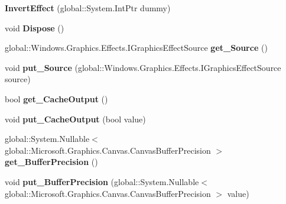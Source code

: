\begin{DoxyCompactItemize}
{\bfseries Invert\+Effect} (global\+::\+System.\+Int\+Ptr dummy)
\item 
\mbox{\label{class_microsoft_1_1_graphics_1_1_canvas_1_1_effects_1_1_invert_effect_a4cbb66c8027cb5045b12c5081e5c3595}} 
void {\bfseries Dispose} ()
\item 
\mbox{\label{class_microsoft_1_1_graphics_1_1_canvas_1_1_effects_1_1_invert_effect_a1a48c5114100636a70cd61f22db40b37}} 
global\+::\+Windows.\+Graphics.\+Effects.\+I\+Graphics\+Effect\+Source {\bfseries get\+\_\+\+Source} ()
\item 
\mbox{\label{class_microsoft_1_1_graphics_1_1_canvas_1_1_effects_1_1_invert_effect_aba1a182ec0dbb283e58826cd8e09df24}} 
void {\bfseries put\+\_\+\+Source} (global\+::\+Windows.\+Graphics.\+Effects.\+I\+Graphics\+Effect\+Source source)
\item 
\mbox{\label{class_microsoft_1_1_graphics_1_1_canvas_1_1_effects_1_1_invert_effect_a155e7cd471179469832809c7098760de}} 
bool {\bfseries get\+\_\+\+Cache\+Output} ()
\item 
\mbox{\label{class_microsoft_1_1_graphics_1_1_canvas_1_1_effects_1_1_invert_effect_a8b575bd07a563722ae459058581e5b2a}} 
void {\bfseries put\+\_\+\+Cache\+Output} (bool value)
\item 
\mbox{\label{class_microsoft_1_1_graphics_1_1_canvas_1_1_effects_1_1_invert_effect_ac1ff6e8a00d8df419930ecd337d1e79f}} 
global\+::\+System.\+Nullable$<$ global\+::\+Microsoft.\+Graphics.\+Canvas.\+Canvas\+Buffer\+Precision $>$ {\bfseries get\+\_\+\+Buffer\+Precision} ()
\item 
\mbox{\label{class_microsoft_1_1_graphics_1_1_canvas_1_1_effects_1_1_invert_effect_afaf6da3d0f98a295fedd8b9685723f61}} 
void {\bfseries put\+\_\+\+Buffer\+Precision} (global\+::\+System.\+Nullable$<$ global\+::\+Microsoft.\+Graphics.\+Canvas.\+Canvas\+Buffer\+Precision $>$ value)

\end{DoxyCompactItemize}
